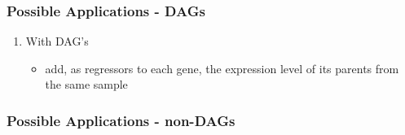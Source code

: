 \documentclass{beamer}
\begin{document}
\begin{frame}
  \frametitle{Possible Applications - DAGs}

  \begin{enumerate}
    \item With DAG's 
      \begin{itemize}
	\item add, as regressors to each gene, the expression level of its parents from the same sample 
      \end{itemize}
  \end{enumerate}
\end{frame}


\begin{frame}
  \frametitle{Possible Applications - non-DAGs}
\end{frame} 

\begin{frame}[allowframebreaks]
   
  
\end{frame}
\end{document}
